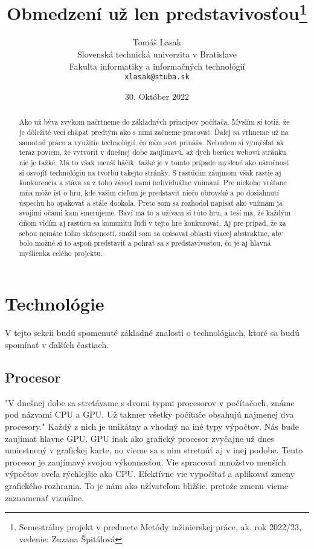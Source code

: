 \documentclass[10pt,twoside,slovak,a4paper]{article}
\title{Obmedzení už len predstavivosťou\thanks{Semestrálny projekt v predmete Metódy inžinierskej práce, ak. rok 2022/23, vedenie: Zuzana Špitálová}}
\author{Tomáš Lasak\\[2pt]
	{\small Slovenská technická univerzita v Bratislave}\\
	{\small Fakulta informatiky a informačných technológií}\\
	{\small \texttt{xlasak@stuba.sk}}
	}
\date{\small 30. Október 2022}
\begin{document}
\maketitle

\begin{abstract}
	
	Ako už býva zvykom načrtneme do základných princípov počítača. Myslím si totiž, že je dôležité veci chápať predtým ako s nimi začneme pracovať. Ďalej sa vrhneme už na samotnú prácu a využitie technológií, čo nám svet prináša. Nebudem si vymýšľať ak teraz poviem, že vytvoriť v dnešnej dobe zaujímavú, až dych berúcu webovú stránku nie je ťažké. Má to však menší háčik, ťažké je v tomto prípade myslené ako náročnosť si osvojiť technológiu na tvorbu takejto stránky.    S rastúcim záujmom však rastie aj konkurencia a stáva sa z toho závod nami individuálne vnímaní. Pre niekoho vrátane mňa môže ísť o hru, kde vašim cieľom je predstaviť niečo obrovské a po dosiahnutí úspechu ho opakovať a stále dookola. Preto som sa rozhodol napísať ako vnímam ja svojimi očami kam smerujeme. Baví ma to a užívam si túto hru, a teší ma, že každým dňom vidím aj rastúcu sa komunitu ľudí v tejto hre konkurovať. Aj pre prípad, že za sebou nemáte toľko skúseností, snažil som sa opisovať oblasti viacej abstraktne, aby bolo možné si to aspoň predstaviť a pohrať sa s predstavivosťou, čo je aj hlavná myšlienka celého projektu.

\end{abstract}

\section{Technológie}

V tejto sekcii budú spomenuté základné znalosti o technológiach, ktoré sa budú spomínať v ďalších častiach. 

\subsection{Procesor}

"V dnešnej dobe sa stretávame s dvomi typmi procesorov v počítačoch, známe pod názvami CPU a GPU. Už takmer všetky počítače obsahujú najmenej dva procesory."\cite{Graphics-programming} Každý z nich je unikátny a vhodný na iné typy výpočtov. Nás bude zaujímať hlavne GPU. GPU inak ako grafický procesor zvyčajne už dnes umiestnený v grafickej karte, no vieme sa s nim stretnúť aj v inej podobe. Tento procesor je zaujímavý svojou výkonnosťou. Vie spracovať množstvo menších výpočtov oveľa rýchlejšie ako CPU. Efektívne vie vypočítať a aplikovať zmeny grafického rozhrania. To je nám ako užívateľom bližšie, pretože zmenu vieme zaznamenať vizuálne.
\end{document}
